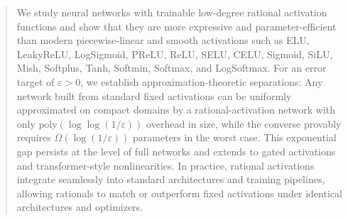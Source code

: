 \documentclass{article}
\theoremstyle{plain}
\theoremstyle{definition}
\theoremstyle{remark}
\begin{document}

\makeatletter
\providecommand{\ICML@appearing}{ {\textit{Proceedings of the
$\mathit{43}^{rd}$ International Conference on Machine Learning},
Seoul, South Korea. PMLR 306, 2026.
Copyright 2026 by the author(s).}}
\makeatother
\printAffiliationsAndNotice{ {\icmlEqualContribution}}



\newcommand{\legline}[1]{\textcolor{#1}{\rule[0.6ex]{1.45em}{0.55pt}}}

\begin{abstract}
We study neural networks with trainable low-degree rational activation functions and show that they are more expressive and parameter-efficient than modern piecewise-linear and smooth activations such as ELU, LeakyReLU, LogSigmoid, PReLU, ReLU, SELU, CELU, Sigmoid, SiLU, Mish, Softplus, Tanh, Softmin, Softmax, and LogSoftmax.
For an error target of $\varepsilon>0$, we establish approximation-theoretic separations: Any network built from standard fixed activations can be uniformly approximated on compact domains by a rational-activation network with only $\mathrm{poly}(\log\log(1/\varepsilon))$ overhead in size, while the converse provably requires $\Omega(\log(1/\varepsilon))$ parameters in the worst case.
This exponential gap persists at the level of full networks and extends to gated activations and transformer-style nonlinearities.
In practice, rational activations integrate seamlessly into standard architectures and training pipelines, allowing rationals to match or outperform fixed activations under identical architectures and optimizers. 
\end{abstract}
\end{document}
